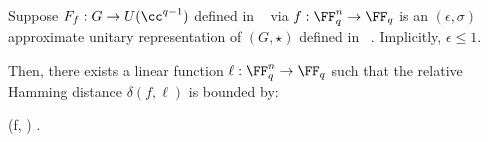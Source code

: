     


\begin{lemma} \label{lem:gh_linearity_formalized}\leanok
Suppose $F_f: G \to U(\cc^{q-1})$ defined in ~ via $f : \FF_q^n \to \FF_q$ is an $(\epsilon, \sigma)$ approximate unitary representation of $(G, \star)$ defined in ~. 
Implicitly, $\epsilon \leq 1$.

Then, there exists a linear function $\ell: \FF_q^n \to \FF_q$ such that the relative Hamming distance $\delta(f, \ell)$ is bounded by:

\be\label{eq:GH-linear-bound}
\delta(f, \ell) \le {} \epsilon.
\ee
\end{lemma}


